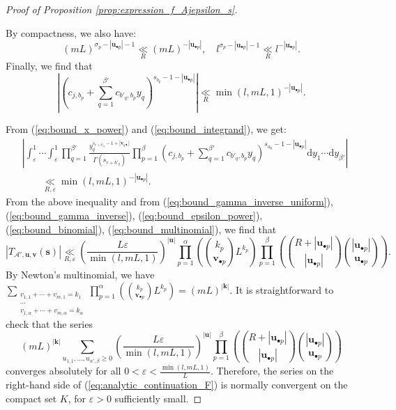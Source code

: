 \documentclass[10pt,a4paper]{amsart}
\newcommand{\dd}{\mathrm{d}}
\begin{document}
\begin{proof}[Proof of Proposition \ref{prop:expression_f_Ajepsilon_s}]
\begin{enumerate}
By compactness, we also have:
$$ (mL)^{\sigma_p-|\mathbf{u}_{\bullet p}|-1} \underset{R}{\ll} (mL)^{-|\mathbf{u}_{\bullet p}|}, \quad l^{\sigma_p-|\mathbf{u}_{\bullet p}|-1} \underset{R}{\ll} l^{-|\mathbf{u}_{\bullet p}|}. $$
Finally, we find that
\begin{equation}
    \left| \left(c_{j,b_p}+\sum_{q=1}^{\beta'} c_{b'_q,b_p} y_{q} \right)^{s_{b_p}-1-|\mathbf{u}_{\bullet p}|} \right| \underset{R}{\ll} \min(l,mL,1)^{-|\mathbf{u}_{\bullet p}|}. \label{eq:bound_integrand}
\end{equation}
\end{enumerate}
From (\ref{eq:bound_x_power}) and (\ref{eq:bound_integrand}), we get:
\begin{align*}
    & \left| \int_{\varepsilon}^{1} \cdots \int_{\varepsilon}^1 \prod_{q=1}^{\beta'} \frac{y_q^{s_{r+b'_q}-1+ |\mathbf{v}_{q \bullet}|}}{\Gamma(s_{r+b'_q})} \prod_{p=1}^{\beta} \left( c_{j,b_p}+\sum_{q=1}^{\beta'} c_{b'_q,b_p} y_{q} \right)^{s_{a_p}-1-|\mathbf{u}_{\bullet p}|} \dd y_1 \cdots \dd y_{\beta'} \right| \\ 
    & \qquad \underset{R,\varepsilon}{\ll} \min(l,mL,1)^{-|\mathbf{u}_{\bullet p}|}.
\end{align*}
From the above inequality and from (\ref{eq:bound_gamma_inverse_uniform}), (\ref{eq:bound_gamma_inverse}), (\ref{eq:bound_epsilon_power}), (\ref{eq:bound_binomial}), (\ref{eq:bound_multinomial}), we find that 
$$ |T_{\mathcal{A}',\mathbf{u},\mathbf{v}}(\mathbf{s})| \underset{R,\varepsilon}{\ll} \left(\frac{L\varepsilon}{\min(l,mL,1)} \right)^{|\mathbf{u}|} \prod_{p=1}^{\alpha} \left( \binom{k_p}{\mathbf{v}_{\bullet p}} L^{k_p} \right) \prod_{p=1}^{\beta} \left( \binom{R+|\mathbf{u}_{\bullet p}|}{|\mathbf{u}_{\bullet p}|} \binom{|\mathbf{u}_{\bullet p}|}{\mathbf{u}_{\bullet p}} \right).$$
By Newton's multinomial, we have $\displaystyle{\sum_{\substack{v_{1,1}+\cdots+v_{m,1}=k_1 \\ \cdots \\ v_{1,\alpha}+\cdots+v_{m,\alpha}=k_{\alpha}}} \prod_{p=1}^{\alpha} \left( \binom{k_p}{\mathbf{v}_{\bullet p}} L^{k_p} \right)=(mL)^{|\mathbf{k}|}}$. It is straightforward to check that the series 
$$ (mL)^{|\mathbf{k}|} \sum_{u_{1,1},\ldots,u_{\alpha',\beta} \geq 0} \left(\frac{L\varepsilon}{\min(l,mL,1)} \right)^{|\mathbf{u}|} \prod_{p=1}^{\beta} \left( \binom{R+|\mathbf{u}_{\bullet p}|}{|\mathbf{u}_{\bullet p}|} \binom{|\mathbf{u}_{\bullet p}|}{\mathbf{u}_{\bullet p}} \right) $$
converges absolutely for all $0 < \varepsilon < \frac{\min(l,mL,1)}{L}$. Therefore, the series on the right-hand side of (\ref{eq:analytic_continuation_F}) is normally convergent on the compact set $K$, for $\varepsilon>0$ sufficiently small.


\end{proof}
\end{document}
